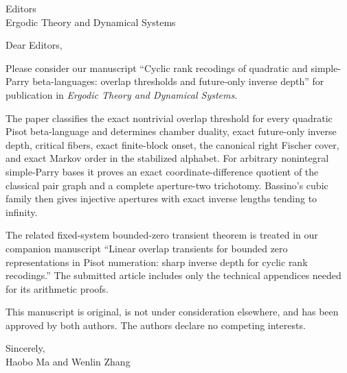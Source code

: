 \documentclass[11pt]{letter}
\begin{document}
\begin{letter}{Editors\\Ergodic Theory and Dynamical Systems}
\opening{Dear Editors,}

Please consider our manuscript ``Cyclic rank recodings of quadratic and
simple-Parry beta-languages: overlap thresholds and future-only inverse depth''
for publication in \emph{Ergodic Theory and Dynamical Systems}.

The paper classifies the exact nontrivial overlap threshold for every
quadratic Pisot beta-language and determines chamber duality, exact
future-only inverse depth, critical fibers, exact finite-block onset, the canonical
right Fischer cover, and exact Markov order in the stabilized alphabet.  For
arbitrary nonintegral simple-Parry bases it proves an exact
coordinate-difference quotient of the classical pair graph and a complete
aperture-two trichotomy.  Bassino's cubic family then gives injective
apertures with exact inverse lengths tending to infinity.

The related fixed-system bounded-zero transient theorem is treated in our
companion manuscript ``Linear overlap transients for bounded zero
representations in Pisot numeration: sharp inverse depth for cyclic rank
recodings.''  The submitted article includes only the technical appendices
needed for its arithmetic proofs.

This manuscript is original, is not under consideration elsewhere, and has
been approved by both authors.  The authors declare no competing interests.

\closing{Sincerely,\\Haobo Ma and Wenlin Zhang}
\end{letter}
\end{document}
